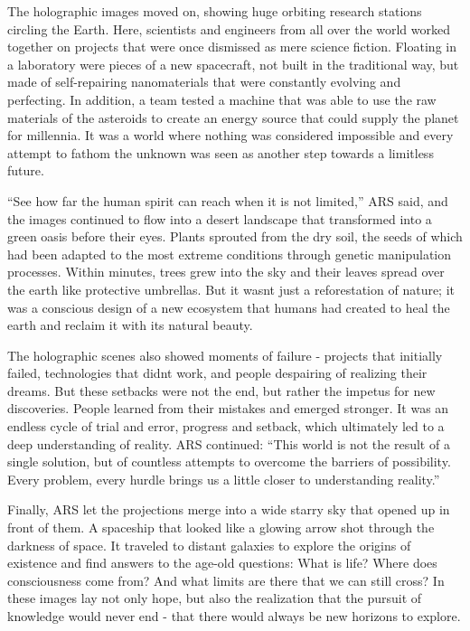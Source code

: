 \documentclass[
]{article}
\begin{document}
The holographic images moved on, showing huge orbiting research stations
circling the Earth. Here, scientists and engineers from all over the
world worked together on projects that were once dismissed as mere
science fiction. Floating in a laboratory were pieces of a new
spacecraft, not built in the traditional way, but made of self-repairing
nanomaterials that were constantly evolving and perfecting. In addition,
a team tested a machine that was able to use the raw materials of the
asteroids to create an energy source that could supply the planet for
millennia. It was a world where nothing was considered impossible and
every attempt to fathom the unknown was seen as another step towards a
limitless future.

``See how far the human spirit can reach when it is not limited,'' ARS
said, and the images continued to flow into a desert landscape that
transformed into a green oasis before their eyes. Plants sprouted from
the dry soil, the seeds of which had been adapted to the most extreme
conditions through genetic manipulation processes. Within minutes, trees
grew into the sky and their leaves spread over the earth like protective
umbrellas. But it wasn\textquotesingle t just a reforestation of nature;
it was a conscious design of a new ecosystem that humans had created to
heal the earth and reclaim it with its natural beauty.

The holographic scenes also showed moments of failure - projects that
initially failed, technologies that didn\textquotesingle t work, and
people despairing of realizing their dreams. But these setbacks were not
the end, but rather the impetus for new discoveries. People learned from
their mistakes and emerged stronger. It was an endless cycle of trial
and error, progress and setback, which ultimately led to a deep
understanding of reality. ARS continued: ``This world is not the result
of a single solution, but of countless attempts to overcome the barriers
of possibility. Every problem, every hurdle brings us a little closer to
understanding reality.''

Finally, ARS let the projections merge into a wide starry sky that
opened up in front of them. A spaceship that looked like a glowing arrow
shot through the darkness of space. It traveled to distant galaxies to
explore the origins of existence and find answers to the age-old
questions: What is life? Where does consciousness come from? And what
limits are there that we can still cross? In these images lay not only
hope, but also the realization that the pursuit of knowledge would never
end - that there would always be new horizons to explore.
\end{document}
